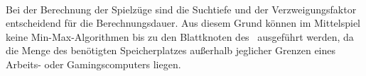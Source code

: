 \\Bei der Berechnung der Spielzüge sind die Suchtiefe und der Verzweigungsfaktor entscheidend für die Berechnungsdauer. Aus diesem Grund können im Mittelspiel keine Min-Max-Algorithmen bis zu den Blattknoten des \gtrees\ ausgeführt werden, da die Menge des benötigten Speicherplatzes außerhalb jeglicher Grenzen eines Arbeits- oder Gamingscomputers liegen.
